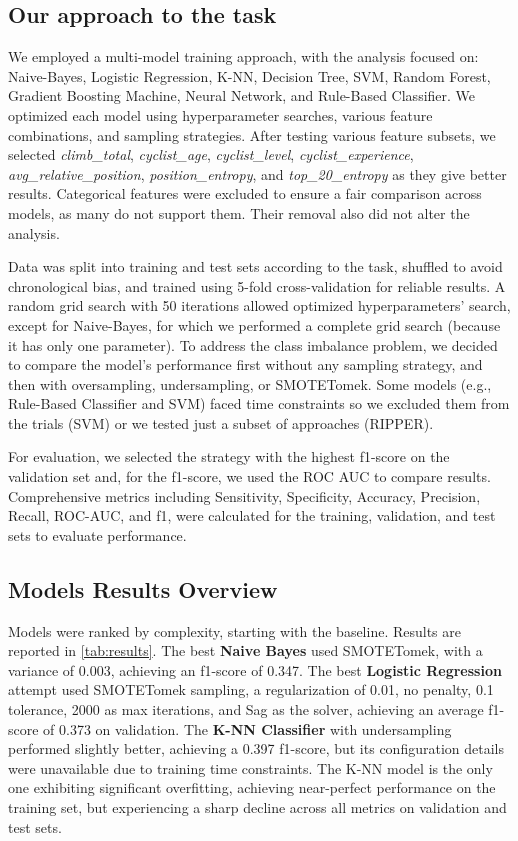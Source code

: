 \subsection{Our approach to the task}
We employed a multi-model training approach, with the analysis focused on: Naive-Bayes, Logistic Regression, K-NN, Decision Tree, SVM, Random Forest, Gradient Boosting Machine, Neural Network, and Rule-Based Classifier. We optimized each model using hyperparameter searches, various feature combinations, and sampling strategies. After testing various feature subsets, we selected \textit{climb\_total}, \textit{cyclist\_age}, \textit{cyclist\_level}, \textit{cyclist\_experience}, \textit{avg\_relative\_position}, \textit{position\_entropy}, and \textit{top\_20\_entropy} as they give better results. Categorical features were excluded to ensure a fair comparison across models, as many do not support them. Their removal also did not alter the analysis.

Data was split into training and test sets according to the task, shuffled to avoid chronological bias, and trained using 5-fold cross-validation for reliable results. A random grid search with 50 iterations allowed optimized hyperparameters' search, except for Naive-Bayes, for which we performed a complete grid search (because it has only one parameter). To address the class imbalance problem, we decided to compare the model's performance first without any sampling strategy, and then with oversampling, undersampling, or SMOTETomek. Some models (e.g., Rule-Based Classifier and SVM) faced time constraints so we excluded them from the trials (SVM) or we tested just a subset of approaches (RIPPER).

For evaluation, we selected the strategy with the highest f1-score on the validation set and, for the f1-score, we used the ROC AUC to compare results. Comprehensive metrics including Sensitivity, Specificity, Accuracy, Precision, Recall, ROC-AUC, and f1, were calculated for the training, validation, and test sets to evaluate performance.

\subsection{Models Results Overview}
Models were ranked by complexity, starting with the baseline. Results are reported in \autoref{tab:results}.  
The best \textbf{Naive Bayes} used SMOTETomek, with a variance of 0.003, achieving an f1-score of 0.347. 
The best \textbf{Logistic Regression} attempt used SMOTETomek sampling, a regularization of 0.01, no penalty, 0.1 tolerance, 2000 as max iterations, and Sag as the solver, achieving an average f1-score of 0.373 on validation. The \textbf{K-NN Classifier} with undersampling performed slightly better, achieving a 0.397 f1-score, but its configuration details were unavailable due to training time constraints. The K-NN model is the only one exhibiting significant overfitting, achieving near-perfect performance on the training set, but experiencing a sharp decline across all metrics on validation and test sets.

